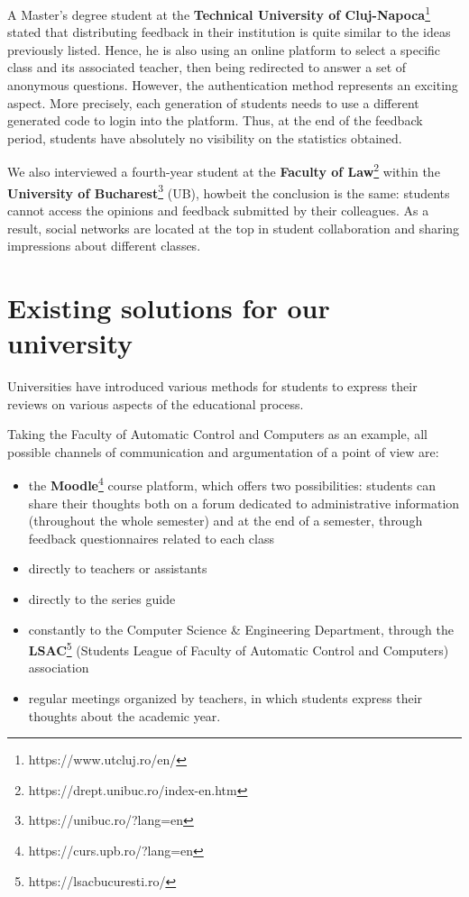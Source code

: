	A Master's degree student at the \textbf{Technical University of Cluj-Napoca}\footnote{https://www.utcluj.ro/en/} stated that distributing feedback in their institution is quite similar to the ideas previously listed. Hence, he is also using an online platform to select a specific class and its associated teacher, then being redirected to answer a set of anonymous questions. However, the authentication method represents an exciting aspect. More precisely, each generation of students needs to use a different generated code to login into the platform. Thus, at the end of the feedback period, students have absolutely no visibility on the statistics obtained.
	
	We also interviewed a fourth-year student at the \textbf{Faculty of Law}\footnote{https://drept.unibuc.ro/index-en.htm} within the \textbf{University of Bucharest}\footnote{https://unibuc.ro/?lang=en} (UB), howbeit the conclusion is the same: students cannot access the opinions and feedback submitted by their colleagues. As a result, social networks are located at the top in student collaboration and sharing impressions about different classes. 
	
\section{Existing solutions for our university} \label{2:existing_solutions}

    Universities have introduced various methods for students to express their reviews on various aspects of the educational process.

    Taking the Faculty of Automatic Control and Computers as an example, all possible channels of communication and argumentation of a point of view are:
    
    \begin{itemize}
                \setlength{\topsep}{0.5pt}
                \setlength{\itemsep}{0.5pt}
                \setlength{\parsep}{0.5pt}
                \item the \textbf{Moodle}\footnote{https://curs.upb.ro/?lang=en} course platform, which offers two possibilities: students can share their thoughts both on a forum dedicated to administrative information (throughout the whole semester) and at the end of a semester, through feedback questionnaires related to each class
                \item directly to teachers or assistants
                \item directly to the series guide
                \item constantly to the Computer Science \& Engineering Department, through the \textbf{LSAC}\footnote{https://lsacbucuresti.ro/} (Students League of Faculty of Automatic Control and Computers) association
                \item regular meetings organized by teachers, in which students express their thoughts about the academic year.
    \end{itemize}
    
